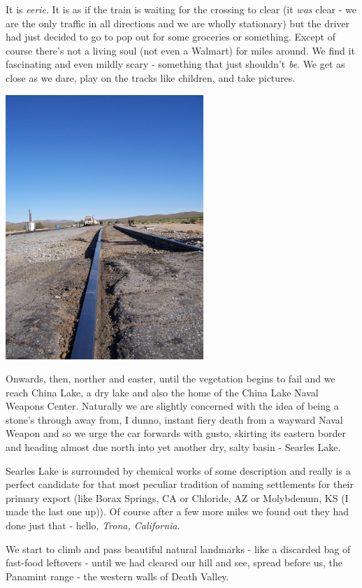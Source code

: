 \documentclass[a5paper,titlepage,11pt]{book}
\begin{document}
It is \emph{eerie}.  It is as if the train is waiting for the crossing to clear (it \emph{was} clear - we are the only traffic in all directions and we are wholly stationary) but the driver had just decided to go to pop out for some groceries or something.  Except of course there's not a living soul (not even a Walmart) for miles around.  We find it fascinating and even mildly scary - something that just shouldn't \emph{be}.  We get as close as we dare, play on the tracks like children, and take pictures.

\begin{center}\includegraphics[height=100mm]{gfx/100_1346}\end{center}

Onwards, then, norther and easter, until the vegetation begins to fail and we reach China Lake, a dry lake and also the home of the China Lake Naval Weapons Center.  Naturally we are slightly concerned with the idea of being a stone's through away from, I dunno, instant fiery death from a wayward Naval Weapon and so we urge the car forwards with gusto, skirting its eastern border and heading almost due north into yet another dry, salty basin - Searles Lake.

Searles Lake is surrounded by chemical works of some description and really is a perfect candidate for that most peculiar tradition of naming settlements for their primary export (like Borax Springs, CA or Chloride, AZ or Molybdenum, KS (I made the last one up)).  Of course after a few more miles we found out they had done just that - hello, \emph{Trona, California}.

We start to climb and pass beautiful natural landmarks - like a discarded bag of fast-food leftovers - until we had cleared our hill and see, spread before us, the Panamint range - the western walls of Death Valley.
\end{document}
